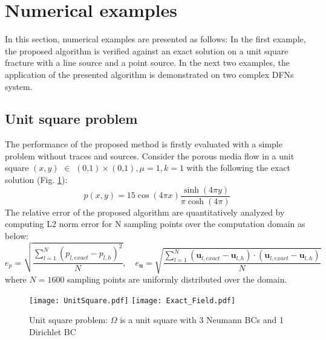 \documentclass[num-refs]{wiley-networks}
\begin{document}
\section{Numerical examples}
In this section, numerical examples are presented as follows: In the first example, the proposed algorithm is verified against an exact solution on a unit square fracture with a line source and a point source. In the next two examples, the application of the presented algorithm is demonstrated on two complex DFNs system.  

\subsection{Unit square problem}
The performance of the proposed method is firstly evaluated with a simple problem without traces and sources. Consider the porous media flow in a unit square $\left( x,y \right) \,\,\in \,\,\left( \text{0,}1 \right) \times \left( \text{0,}1 \right), \mu =1, k=1$ with the following the exact solution (Fig. \ref{fig:Case_Exact}):
\begin{equation}
    p\left( x,y \right) =\text{15}\cos \left( 4\pi x \right) \frac{\sinh \left( 4\pi y \right)}{\pi \cosh \left( 4\pi \right)}
\end{equation}
The relative error of the proposed algorithm are quantitatively analyzed by computing L2 norm error for N sampling points over the computation domain as below:
\begin{equation}
    e_p=\sqrt{\frac{\sum_{l=1}^N{\left( p_{l,exact}-p_{l,h} \right) ^2}}{N}}, \quad e_{\mathbf{u}}=\sqrt{\frac{\sum_{l=1}^N{\left( \mathbf{u}_{l,exact}-\mathbf{u}_{l,h} \right) \cdot \left( \mathbf{u}_{l,exact}-\mathbf{u}_{l,h} \right)}}{N}}
\end{equation}
where $N=1600$ sampling points are uniformly distributed over the domain. 

\begin{figure}[h!]
\centering
\texttt{[image: UnitSquare.pdf]}
\texttt{[image: Exact\_Field.pdf]}
\caption{Unit square problem: $\Omega$ is a unit square with 3 Neumann BCs and 1 Dirichlet BC}
\label{fig:Case_Exact}
\end{figure}
\end{document}
